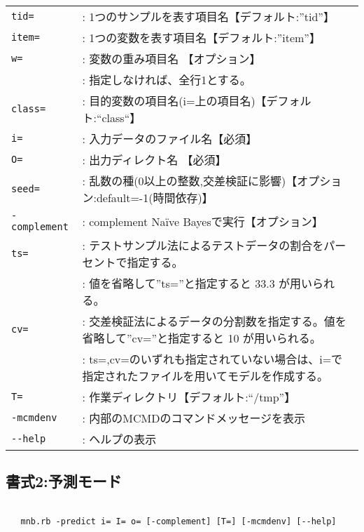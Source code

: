 \begin{table}[htbp]
{\small
\begin{tabular}{ll}

\verb|tid=|        &: 1つのサンプルを表す項目名【デフォルト:''tid''】 \\
\verb|item=|       &: 1つの変数を表す項目名【デフォルト:''item''】 \\
\verb|w=|          &: 変数の重み項目名 【オプション】 \\
                   &: 指定しなければ、全行1とする。 \\
\verb|class=|      &: 目的変数の項目名(i=上の項目名)【デフォルト:``class``】\\
\verb|i=|          &: 入力データのファイル名【必須】\\
\verb|O=|          &: 出力ディレクト名 【必須】\\
\verb|seed=|       &: 乱数の種(0以上の整数,交差検証に影響)【オプション:default=-1(時間依存)】\\
\verb|-complement| &: complement Na{\"i}ve Bayesで実行【オプション】\\
\verb|ts=|         &: テストサンプル法によるテストデータの割合をパーセントで指定する。\\
                   &: 値を省略して”ts=”と指定すると 33.3 が用いられる。\\
\verb|cv=|         &: 交差検証法によるデータの分割数を指定する。値を省略して”cv=”と指定すると 10 が用いられる。 \\
                   &: ts=,cv=のいずれも指定されていない場合は、i=で指定されたファイルを用いてモデルを作成する。\\
\verb|T=|          &: 作業ディレクトリ【デフォルト:``/tmp''】\\
\verb|-mcmdenv|    &: 内部のMCMDのコマンドメッセージを表示\\
\verb|--help|      &: ヘルプの表示 \\
\end{tabular} 
}
\end{table} 

\subsection{書式2:予測モード}
\begin{verbatim}

   mnb.rb -predict i= I= o= [-complement] [T=] [-mcmdenv] [--help] 

\end{verbatim}

